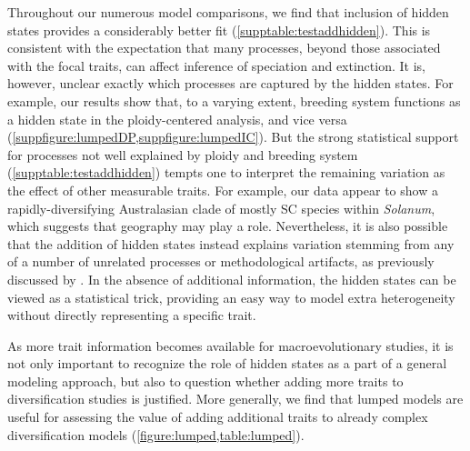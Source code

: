 Throughout our numerous model comparisons, we find that inclusion of hidden states provides a considerably better fit (\cref{supptable:testaddhidden}). 
This is consistent with the expectation that many processes, beyond those associated with the focal traits, can affect inference of speciation and extinction. 
It is, however, unclear exactly which processes are captured by the hidden states. 
For example, our results show that, to a varying extent, breeding system functions as a hidden state in the ploidy-centered analysis, and vice versa (\cref{suppfigure:lumpedDP,suppfigure:lumpedIC}). 
But the strong statistical support for processes not well explained by ploidy and breeding system (\cref{supptable:testaddhidden}) tempts one to interpret the remaining variation as the effect of other measurable traits. 
For example, our data appear to show a rapidly-diversifying Australasian clade of mostly SC species within \emph{Solanum}, which suggests that geography may play a role. 
Nevertheless, it is also possible that the addition of hidden states instead explains variation stemming from any of a number of unrelated processes or methodological artifacts, as previously discussed by \citet{beaulieu_2016}.
In the absence of additional information, the hidden states can be viewed as a statistical trick, providing an easy way to model extra heterogeneity without directly representing a specific trait. 

As more trait information becomes available for macroevolutionary studies, it is not only important to recognize the role of hidden states as a part of a general modeling approach, but also to question whether adding more traits to diversification studies is justified.  
More generally, we find that lumped models are useful for assessing the value of adding additional traits to already complex diversification models (\cref{figure:lumped,table:lumped}).
 
